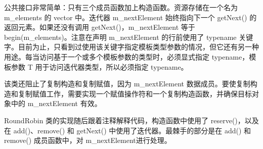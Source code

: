 公共接口非常简单：只有三个成员函数加上构造函数。资源存储在一个名为 m\_elements 的 vector 中。迭代器 m\_nextElement 始终指向下一个 getNext() 的返回元素。如果还没有调用 getNext()，m\_nextElement 等于 begin(m\_elements)。注意在声明 m\_nextElement 的行前使用了 typename 关键字。目前为止，只看到过使用该关键字指定模板类型参数的情况，但它还有另一种用途。每当访问基于一个或多个模板参数的类型时，必须显式指定 typename，模板参数 T 用于访问迭代器类型，所以必须指定 typename。

该类还阻止了复制构造和复制赋值，因为 m\_nextElement 数据成员。要使复制构造和复制赋值工作，需要实现一个赋值操作符和一个复制构造函数，并确保目标对象中的 m\_nextElement 有效。

RoundRobin 类的实现随后跟着注释解释代码，构造函数中使用了 reserve()，以及在 add()、remove() 和 getNext() 中使用了迭代器。最棘手的部分是在 add() 和 remove() 成员函数中，对 m\_nextElement进行处理。

